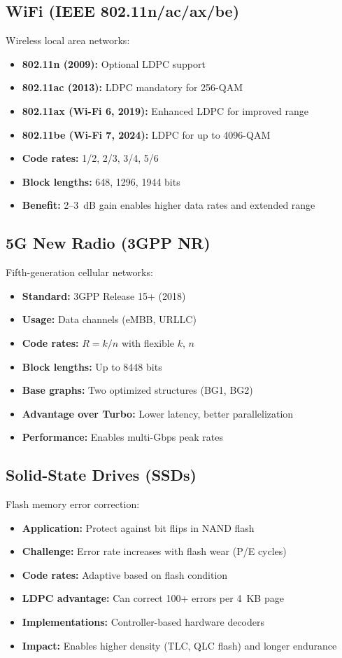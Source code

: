 \subsection{WiFi (IEEE 802.11n/ac/ax/be)}

Wireless local area networks:
\begin{itemize}
\item \textbf{802.11n (2009):} Optional LDPC support
\item \textbf{802.11ac (2013):} LDPC mandatory for 256-QAM
\item \textbf{802.11ax (Wi-Fi 6, 2019):} Enhanced LDPC for improved range
\item \textbf{802.11be (Wi-Fi 7, 2024):} LDPC for up to 4096-QAM
\item \textbf{Code rates:} 1/2, 2/3, 3/4, 5/6
\item \textbf{Block lengths:} 648, 1296, 1944 bits
\item \textbf{Benefit:} 2--3~dB gain enables higher data rates and extended range
\end{itemize}

\subsection{5G New Radio (3GPP NR)}

Fifth-generation cellular networks:
\begin{itemize}
\item \textbf{Standard:} 3GPP Release 15+ (2018)
\item \textbf{Usage:} Data channels (eMBB, URLLC)
\item \textbf{Code rates:} $R = k/n$ with flexible $k$, $n$
\item \textbf{Block lengths:} Up to 8448 bits
\item \textbf{Base graphs:} Two optimized structures (BG1, BG2)
\item \textbf{Advantage over Turbo:} Lower latency, better parallelization
\item \textbf{Performance:} Enables multi-Gbps peak rates
\end{itemize}

\subsection{Solid-State Drives (SSDs)}

Flash memory error correction:
\begin{itemize}
\item \textbf{Application:} Protect against bit flips in NAND flash
\item \textbf{Challenge:} Error rate increases with flash wear (P/E cycles)
\item \textbf{Code rates:} Adaptive based on flash condition
\item \textbf{LDPC advantage:} Can correct 100+ errors per 4~KB page
\item \textbf{Implementations:} Controller-based hardware decoders
\item \textbf{Impact:} Enables higher density (TLC, QLC flash) and longer endurance
\end{itemize}

